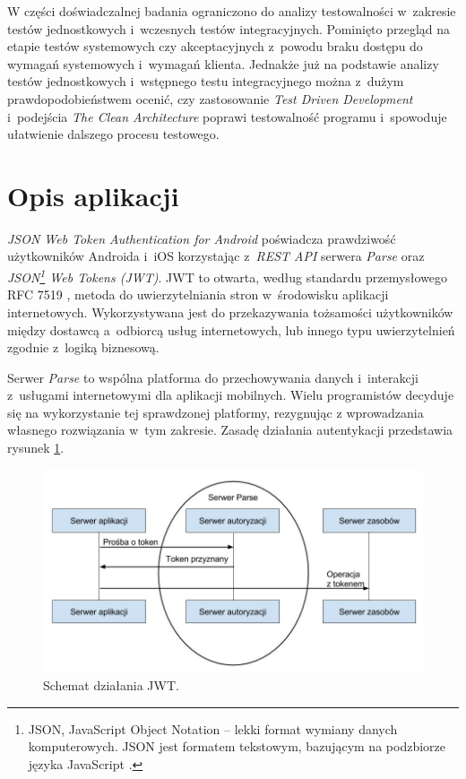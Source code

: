 W części doświadczalnej badania ograniczono do analizy testowalności w~zakresie testów jednostkowych i~wczesnych testów integracyjnych. Pominięto przegląd na etapie testów systemowych czy akceptacyjnych z~powodu braku dostępu do wymagań systemowych i~wymagań klienta. Jednakże już na podstawie analizy testów jednostkowych i~wstępnego testu integracyjnego można z~dużym prawdopodobieństwem ocenić, czy zastosowanie \textit{Test Driven Development} i~podejścia \textit{The Clean Architecture} poprawi testowalność programu i~spowoduje ułatwienie dalszego procesu testowego.

\section{Opis aplikacji}
\textit{JSON Web Token Authentication for Android} poświadcza prawdziwość użytkowników Androida i~iOS korzystając z~\textit{REST API} serwera \textit{Parse} oraz \textit{JSON\footnote{JSON, JavaScript Object Notation – lekki format wymiany danych komputerowych. JSON jest formatem tekstowym, bazującym na podzbiorze języka JavaScript \cite{website:wikipedia}.} Web Tokens (JWT)}. JWT to otwarta, według standardu przemysłowego RFC 7519 \cite{website:jwt:rfc7519}, metoda do uwierzytelniania stron w~środowisku aplikacji internetowych. Wykorzystywana jest do przekazywania tożsamości użytkowników między dostawcą a~odbiorcą usług internetowych, lub innego typu uwierzytelnień zgodnie z~logiką biznesową. 

Serwer \textit{Parse} to wspólna platforma do przechowywania danych i~interakcji z~usługami internetowymi dla aplikacji mobilnych. Wielu programistów decyduje się na wykorzystanie tej sprawdzonej platformy, rezygnując z wprowadzania własnego rozwiązania w~tym zakresie. Zasadę działania autentykacji przedstawia rysunek \ref{fig:token}.

\begin{figure}[!htb]
    \centering
    \includegraphics[width=12cm]{imgs/ch6_token.jpg}
    \caption
{Schemat działania JWT.}
    \label{fig:token}
\end{figure} 

